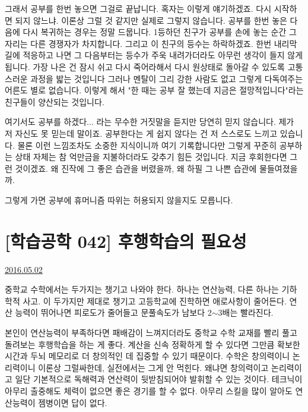 그래서 공부를 한번 놓으면 그걸로 끝납니다.
혹자는 이렇게 얘기하겠죠. 다시 시작하면 되지 않느냐.
이론상 그럴 것 같지만 실제로 그렇지 않습니다. 공부를 한번 놓은 다음에 다시 복귀하는 경우는 정말 드뭅니다.
1등하던 친구가 공부를 손에 놓는 순간 그 자리는 다른 경쟁자가 차지합니다. 그리고 이 친구의 등수는 하락하겠죠.
한번 내리막길에 적응하고 나면 그 다음부터는 등수가 주욱 내려가더라도 아무런 생각이 들지 않게 됩니다.
가장 나은 건 잠시 쉬고 다시 죽어라해서 다시 원상태로 돌아갈 수 있도록 고통스러운 과정을 밟는 것입니다
그러나 멘탈이 그리 강한 사람도 없고 그렇게 다독여주는 어른도 별로 없습니다.
이렇게 해서 "한 때는 공부 잘 했는데 지금은 절망적입니다"라는 친구들이 양산되는 것입니다.
\vspace{5mm}

여기서도 공부를 하겠다... 라는 무수한 거짓말을 듣지만 당연히 믿지 않습니다. 제가 저 자신도 못 믿는데 말이죠.
공부한다는 게 쉽지 않다는 건 저 스스로도 느끼고 있습니다. 물론 이런 느낌조차도 소중한 지식이니까 여기 기록합니다만
그렇게 꾸준히 공부하는 상태 자체는 참 억만금을 지불하더라도 갖추기 힘든 것입니다.
지금 후회한다면 그런 것이겠죠. 왜 진작에 그 좋은 습관을 버렸을까, 왜 하필 그 나쁜 습관에 물들여졌을까.
\vspace{5mm}

그렇게 가면 공부에 휴머니즘 따위는 허용되지 않을지도 모릅니다.
\vspace{5mm}






\section{[학습공학 042] 후행학습의 필요성}
\href{https://www.kockoc.com/Apoc/756847}{2016.05.02}

\vspace{5mm}

중학교 수학에서는 두가지는 챙기고 나와야 한다.
하나는 연산능력, 다른 하나는 기하학적 사고.
이 두가지만 제대로 챙기고 고등학교에 진학하면 애로사항이 줄어든다.
연산 능력이 뛰어나면 피로도가 줄어들고 문풀속도가 남보다 2$\sim$3배는 빨라진다.
\vspace{5mm}

본인이 연산능력이 부족하다면 패배감이 느껴지더라도 중학교 수학 교재를 빨리 풀고 돌려보는 후행학습을 하는 게 좋다.
계산을 신속 정확하게 할 수 있다면 그만큼 확보한 시간과 두뇌 메모리로 더 창의적인 데 집중할 수 있기 때문이다.
수학은 창의력이니 논리력이니 이론상 그럴싸한데, 실전에서는 그게 안 먹힌다.
왜냐면 창의력이고 논리력이고 일단 기본적으로 독해력과 연산력이 뒷받침되어야 발휘할 수 있는 것이다.
테크닉이 아무리 출중해도 체력이 없으면 좋은 경기를 할 수 없다.
아무리 스킬을 많이 알아도 연산능력이 젬병이면 답이 없다.
\vspace{5mm}


